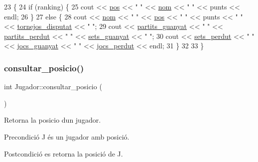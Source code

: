 \begin{DoxyCode}
23                                                       \{
24     \textcolor{keywordflow}{if} (ranking) \{
25         cout << \mbox{\hyperlink{class_jugador_a25a7eeb0d334b2fe60bb490704c6626d}{pos}} << \textcolor{stringliteral}{" "} << \mbox{\hyperlink{class_jugador_afd6bec98df8ebb3d2db3ef583a76cfa1}{nom}} << \textcolor{stringliteral}{" "} << punts << endl;
26     \} 
27     \textcolor{keywordflow}{else} \{
28         cout << \mbox{\hyperlink{class_jugador_afd6bec98df8ebb3d2db3ef583a76cfa1}{nom}} << \textcolor{stringliteral}{" "} << \mbox{\hyperlink{class_jugador_a25a7eeb0d334b2fe60bb490704c6626d}{pos}} << \textcolor{stringliteral}{" "} << punts << \textcolor{stringliteral}{" "} << 
      \mbox{\hyperlink{class_jugador_a2ef0821abd64385a58561b039c37a469}{tornejos\_disputat}} << \textcolor{stringliteral}{" "};
29         cout << \mbox{\hyperlink{class_jugador_a6bf9a674be86bfce7945f7c0dfbe531f}{partits\_guanyat}} << \textcolor{stringliteral}{" "} << \mbox{\hyperlink{class_jugador_ad1e6a56bea30a1449dbb37871c288fcf}{partits\_perdut}} << \textcolor{stringliteral}{" "} << 
      \mbox{\hyperlink{class_jugador_a396b226c722425d387f36e239fc9855c}{sets\_guanyat}} << \textcolor{stringliteral}{" "};
30         cout << \mbox{\hyperlink{class_jugador_a7c9fcb3ec52c2c400e7cf8faaf945426}{sets\_perdut}} << \textcolor{stringliteral}{" "} << \mbox{\hyperlink{class_jugador_a0eb97835e7dd3143f626c1d15edb7392}{jocs\_guanyat}} << \textcolor{stringliteral}{" "} << 
      \mbox{\hyperlink{class_jugador_a04e5cf90e57c490b4c088e29763479f7}{jocs\_perdut}} << endl;
31     \}
32     
33 \}
\end{DoxyCode}
\mbox{\label{class_jugador_ac23e47ec747a3bfcabcf047ef9b599de}} 
\subsubsection{\texorpdfstring{consultar\+\_\+posicio()}{consultar\_posicio()}}
{\footnotesize\ttfamily int Jugador\+::consultar\+\_\+posicio (\begin{DoxyParamCaption}{ }\end{DoxyParamCaption})}



Retorna la posicio d\textquotesingle{}un jugador. 

\begin{DoxyPrecond}{Precondició}
J és un jugador amb posició. 
\end{DoxyPrecond}
\begin{DoxyPostcond}{Postcondició}
es retorna la posició de J. 
\end{DoxyPostcond}


